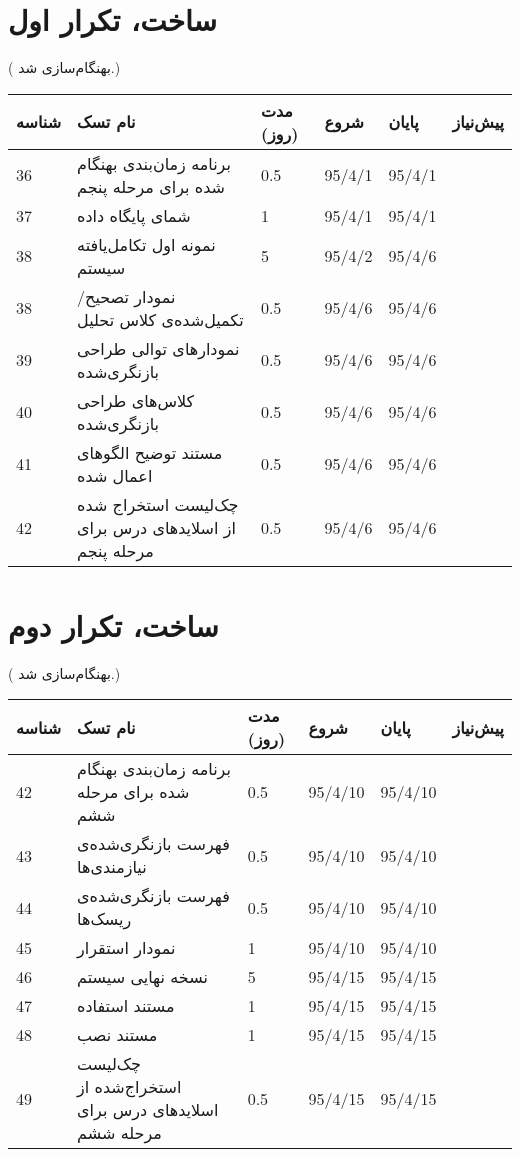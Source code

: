\section{ساخت، تکرار اول}
({\color{red} بهنگام‌سازی شد.})

\begin{tabular}[H]{ | l | l | l | l | l | l | }
	\hline
	شناسه & نام تسک & مدت (روز) & شروع & پایان & پیش‌نیاز    \\ \hline
	36 & برنامه زمان‌بندی بهنگام شده برای مرحله پنجم & 0.5   &   95/4/1 &   95/4/1 &  \\ \hline
	37 & شمای پایگاه داده & 1   &   95/4/1 &   95/4/1 &  \\ \hline
	38 & نمونه اول تکامل‌یافته سیستم & 5   &   95/4/2 &   95/4/6 &  \\ \hline
	38 & نمودار تصحیح/تکمیل‌شده‌ی کلاس تحلیل & 0.5 &   95/4/6 &   95/4/6 &  \\ \hline
	39 & نمودارهای توالی طراحی بازنگری‌شده & 0.5 &   95/4/6 &   95/4/6 &  \\ \hline
	40 & کلاس‌های طراحی بازنگری‌شده & 0.5   &   95/4/6 &   95/4/6 &  \\ \hline
	
	41 & مستند توضیح الگوهای اعمال شده & 0.5 &   95/4/6 &   95/4/6 &  \\ \hline
	
	42 & چک‌‌لیست استخراج شده از اسلایدهای درس برای مرحله پنجم & 0.5  &   95/4/6 &   95/4/6 &  \\ \hline
\end{tabular}

\section{ساخت، تکرار دوم}
({\color{red} بهنگام‌سازی شد.})

\begin{tabular}[H]{ | l | l | l | l | l | l | }
	\hline
	شناسه & نام تسک & مدت (روز) & شروع & پایان & پیش‌نیاز    \\ \hline
	42 & برنامه زمان‌بندی بهنگام شده برای مرحله ششم & 0.5   &   95/4/10 &   95/4/10 &  \\ \hline
	43 &  فهرست بازنگری‌شده‌ی نیازمندی‌ها & 0.5   &   95/4/10 &   95/4/10 &  \\ \hline
	44 &  فهرست بازنگری‌شده‌ی ریسک‌ها & 0.5   &   95/4/10 &   95/4/10 &  \\ \hline
	45 & نمودار استقرار & 1   &   95/4/10 &   95/4/10 &      \\ \hline
	46 & نسخه نهایی سیستم & 5   &   95/4/15 &   95/4/15 &      \\ \hline
	47 & مستند استفاده & 1   &   95/4/15 &   95/4/15 &  \\ \hline
	48 & مستند نصب & 1   &   95/4/15 &   95/4/15 &  \\ \hline
	49 & چک‌لیست استخراج‌شده از اسلایدهای درس برای مرحله ششم & 0.5   &   95/4/15 &   95/4/15 &  \\ \hline
\end{tabular}

